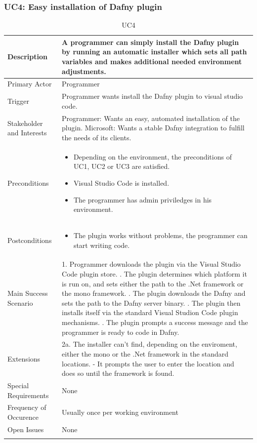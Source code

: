 \subsubsection{UC4: Easy installation of Dafny plugin}
\begin{longtable}{l | p{} }
	Description & A programmer can simply install the Dafny plugin by running an automatic installer which sets all path variables and makes additional needed environment adjustments.\\ \hline
	Primary Actor & Programmer\\ \hline
	Trigger & Programmer wants install the Dafny plugin to visual studio code.\\ \hline
	Stakeholder and Interests & Programmer: Wants an easy, automated installation of the plugin. \newline Microsoft: Wants a stable Dafny integration to fulfill the needs of its clients.\\ \hline
	Preconditions &\begin{itemize}
		\item Depending on the environment, the preconditions of UC1, UC2 or UC3 are satisfied.
		\item Visual Studio Code is installed.
		\item The programmer has admin priviledges in his environment.
	\end{itemize}\\ \hline
	Postconditions & 
	\begin{itemize}
		\item The plugin works without problems, the programmer can start writing code.
	\end{itemize} \\ \hline
	Main Success Scenario & 
	1. Programmer downloads the plugin via the Visual Studio Code plugin store. \newline
	2. The plugin determines which platform it is run on, and sets either the path to the .Net framework or the mono framework. \newline
	3. The plugin downloads the Dafny and sets the path to the Dafny server binary. \newline
	4. The plugin then installs itself via the standard Visual Studion Code plugin mechanisms. \newline
	5. The plugin prompts a success message and the programmer is ready to code in Dafny.\\ \hline
	Extensions & 
	2a. The installer can't find, depending on the enviroment, either the mono or the .Net framework in the standard locations. \newline 
	- It prompts the user to enter the location and does so until the framework is found. \\ \hline
	Special Requirements & None\\ \hline
	Frequency of Occurence & Usually once per working environment\\ \hline
	Open Issues & None \\ \hline
	\caption{UC4}
\end{longtable}

